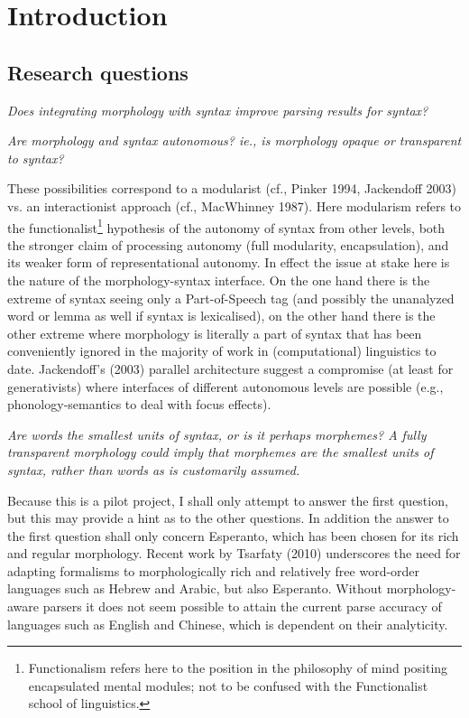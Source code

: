 \documentclass[10pt,a4paper]{article}
\begin{document}
\section{Introduction}
\subsection{Research questions}

\emph{
Does integrating morphology with syntax improve parsing results for
syntax?}

\emph{
Are morphology and syntax autonomous? ie., is morphology opaque or
transparent to syntax?
}

These possibilities correspond to a modularist (cf., Pinker 1994, Jackendoff
2003) vs. an interactionist approach (cf., MacWhinney 1987). Here modularism
refers to the functionalist\footnote{Functionalism refers here to the position
in the philosophy of mind positing encapsulated mental modules; not to be confused with the
Functionalist school of linguistics.} hypothesis of the autonomy of syntax from
other levels, both the stronger claim of processing autonomy (full modularity,
encapsulation), and its weaker form of representational autonomy. In effect the
issue at stake here is the nature of the morphology-syntax interface. On the
one hand there is the extreme of syntax seeing only a Part-of-Speech tag (and
possibly the unanalyzed word or lemma as well if syntax is lexicalised), on the
other hand there is the other extreme where morphology is literally a part of
syntax that has been conveniently ignored in the majority of work in
(computational) linguistics to date.  Jackendoff's (2003) parallel architecture
suggest a compromise (at least for generativists) where interfaces of different
autonomous levels are possible (e.g., phonology-semantics to deal with focus
effects).

\emph{
Are words the smallest units of syntax, or is it perhaps morphemes? A
fully transparent morphology could imply that morphemes are the smallest units
of syntax, rather than words as is customarily assumed.
}


Because this is a pilot project, I shall only attempt to answer the first
question, but this may provide a hint as to the other questions. In addition
the answer to the first question shall only concern Esperanto, which has been
chosen for its rich and regular morphology. Recent work by Tsarfaty (2010)
underscores the need for adapting formalisms to morphologically rich and
relatively free word-order languages such as Hebrew and Arabic, but also
Esperanto. Without morphology-aware parsers it does not seem possible to attain
the current parse accuracy of languages such as English and Chinese, which is 
dependent on their analyticity.
\end{document}
